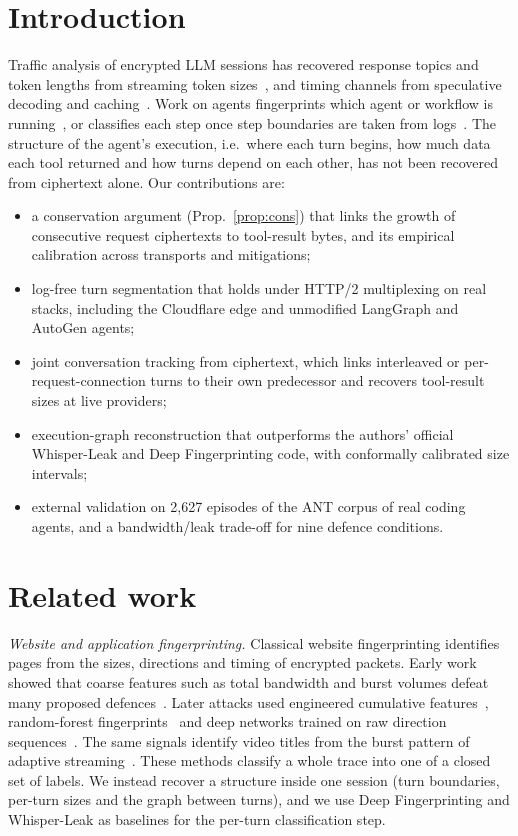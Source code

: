 \documentclass[journal]{IEEEtran}
\begin{document}
\section{Introduction}
Traffic analysis of encrypted LLM sessions has recovered response topics and token lengths from streaming token sizes~\cite{weiss2024,whisperleak,netecho,length2content}, and timing channels from speculative decoding and caching~\cite{carlini2024,earlybird,gu2025}. Work on agents fingerprints which agent or workflow is running~\cite{agentprint,kang2026,lugoloobi2026,dangol2026}, or classifies each step once step boundaries are taken from logs~\cite{ant}.
The structure of the agent's execution, i.e.\ where each turn begins, how much data each tool returned and how turns depend on each other, has not been recovered from ciphertext alone. Our contributions are:
\begin{itemize}
\item a conservation argument (Prop.~\ref{prop:cons}) that links the growth of consecutive request ciphertexts to tool-result bytes, and its empirical calibration across transports and mitigations;
\item log-free turn segmentation that holds under HTTP/2 multiplexing on real stacks, including the Cloudflare edge and unmodified LangGraph and AutoGen agents;
\item joint conversation tracking from ciphertext, which links interleaved or per-request-connection turns to their own predecessor and recovers tool-result sizes at live providers;
\item execution-graph reconstruction that outperforms the authors' official Whisper-Leak and Deep Fingerprinting code, with conformally calibrated size intervals;
\item external validation on 2,627 episodes of the ANT corpus of real coding agents, and a bandwidth/leak trade-off for nine defence conditions.
\end{itemize}

\section{Related work}\label{sec:related}
\emph{Website and application fingerprinting.} Classical website fingerprinting identifies pages from the sizes, directions and timing of encrypted packets. Early work showed that coarse features such as total bandwidth and burst volumes defeat many proposed defences~\cite{peekaboo}. Later attacks used engineered cumulative features~\cite{cumul}, random-forest fingerprints~\cite{kfp} and deep networks trained on raw direction sequences~\cite{rimmer2018,df,varcnn}. The same signals identify video titles from the burst pattern of adaptive streaming~\cite{schuster2017,reed2017}. These methods classify a whole trace into one of a closed set of labels. We instead recover a structure inside one session (turn boundaries, per-turn sizes and the graph between turns), and we use Deep Fingerprinting and Whisper-Leak as baselines for the per-turn classification step.
\end{document}
